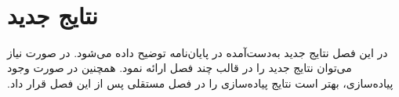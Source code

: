 ‫
‫\section{نتایج جدید}
‫
‫در این فصل نتایج جدید به‌دست‌آمده در پایان‌نامه توضیح داده می‌شود.
‫در صورت نیاز می‌توان نتایج جدید را در قالب چند فصل ارائه نمود.
‫همچنین در صورت وجود پیاده‌سازی، بهتر است نتایج پیاده‌سازی را 
‫در فصل مستقلی پس از این فصل قرار داد.
‫
